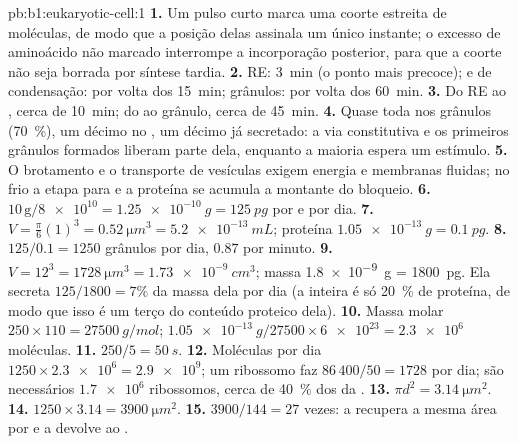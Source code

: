 \begin{solution}{pb:b1:eukaryotic-cell:1}
\textbf{1.} Um pulso curto marca uma coorte estreita de moléculas, de
modo que a posição delas assinala um único instante; o excesso de
aminoácido não marcado interrompe a incorporação posterior, para que a
coorte não seja borrada por síntese tardia.
\textbf{2.} RE: \qty{3}{min} (o ponto mais precoce);  e  de
condensação: por volta dos \qty{15}{min}; grânulos: por volta dos
\qty{60}{min}.
\textbf{3.} Do RE ao , cerca de \qty{10}{min}; do  ao grânulo,
cerca de \qty{45}{min}.
\textbf{4.} Quase toda nos grânulos (\qty{70}{\%}), um décimo no ,
um décimo já secretado: a via constitutiva e os primeiros grânulos
formados liberam parte dela, enquanto a maioria espera um estímulo.
\textbf{5.} O brotamento e o transporte de vesículas exigem energia e
membranas fluidas; no frio a etapa  para e a proteína se acumula
a montante do bloqueio.
\textbf{6.} $10\,\mathrm{g}/\num{8e10} = \qty{1.25e-10}{g} =
\qty{125}{pg}$ por  e por dia.
\textbf{7.} $V = \frac{\pi}{6}(1)^3 = \qty{0.52}{\micro m^3} =
\qty{5.2e-13}{mL}$; proteína $\qty{1.05e-13}{g} = \qty{0.1}{pg}$.
\textbf{8.} $125/0.1 = 1250$ grânulos por dia, $0.87$ por minuto.
\textbf{9.} $V = 12^3 = \qty{1728}{\micro m^3} = \qty{1.73e-9}{cm^3}$;
massa \qty{1.8e-9}{g} = \qty{1800}{pg}. Ela secreta $125/1800 = 7\%$ da
massa dela por dia (a  inteira é só \qty{20}{\%} de proteína, de
modo que isso é um terço do conteúdo proteico dela).
\textbf{10.} Massa molar $250\times 110 = \qty{27500}{g/mol}$;
$\qty{1.05e-13}{g}/27500\times\num{6e23} = \num{2.3e6}$ moléculas.
\textbf{11.} $250/5 = \qty{50}{s}$.
\textbf{12.} Moléculas por dia $1250\times\num{2.3e6} = \num{2.9e9}$;
um ribossomo faz $86\,400/50 = 1728$ por dia; são necessários
$\num{1.7e6}$ ribossomos, cerca de \qty{40}{\%} dos da .
\textbf{13.} $\pi d^2 = \qty{3.14}{\micro m^2}$.
\textbf{14.} $1250\times 3.14 = \qty{3900}{\micro m^2}$.
\textbf{15.} $3900/144 = 27$ vezes: a  recupera a mesma área por
 e a devolve ao .

\end{solution}
